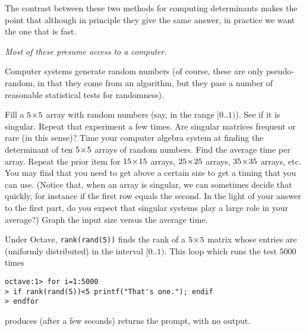 The contrast between these two methods for computing determinants 
makes the point that although in principle they give the same answer, 
in practice we want the one that is fast.




\begin{exercises}
  \item[\textit{Most of these presume access to a computer.}]
  \item 
    Computer systems generate random numbers
    (of course, these are only pseudo-random, in that they come from
    an algorithm, but they 
    pass a number of reasonable statistical tests for randomness).
    \begin{exparts}
      \partsitem Fill a $5 \! \times \! 5$ array with random numbers (say, in the
        range $[0..1)$).
        See if it is singular.
        Repeat that experiment a few times.
        Are singular matrices frequent or rare (in this sense)?
      \partsitem Time your computer algebra system at finding the
        determinant of ten $5 \! \times \! 5$ arrays of random numbers.
        Find the average time per array.
        Repeat the prior item for $15 \! \times \! 15$ arrays,
        $25 \! \times \! 25$ arrays, $35 \! \times \! 35$ arrays, etc.
        You may find that you need to get above a certain size
        to get a timing that you can use. 
        (Notice that, when an array is singular, we can sometimes decide that
        quickly,
        for instance if the first row equals the second.
        In the light of your answer to the first part, do you expect that 
        singular systems play a large role in your average?)
      \partsitem Graph the input size versus the average time.
    \end{exparts}
    \begin{answer}
      \begin{exparts}
        \partsitem Under Octave, \texttt{rank(rand(5))} finds the
          rank of a $5 \! \times \! 5$ matrix whose entries are (uniformly
          distributed) in the interval $[0..1)$.
          This loop which runs the test $5000$ times
\begin{lstlisting}
octave:1> for i=1:5000
> if rank(rand(5))<5 printf("That's one."); endif
> endfor
\end{lstlisting}  
          produces (after a few seconds) returns the prompt, with no output.


\end{exparts}
\end{answer}
\end{exercises}

